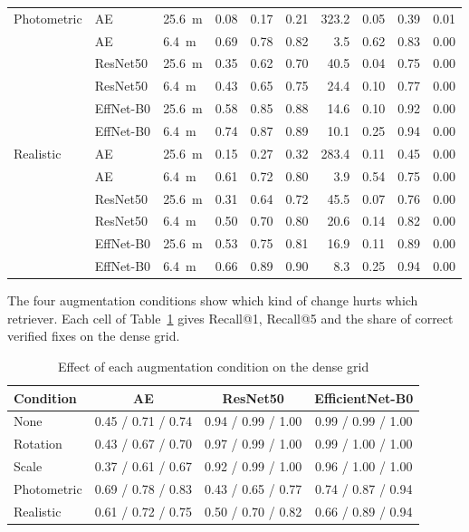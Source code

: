 \documentclass[english, Lau, oneside]{sapthesis}%
\begin{document}
\begin{table}[!htbp]
\begin{tabular}{lllrrrrrrr}
    \addlinespace
    Photometric & AE & 25.6~m & 0.08 & 0.17 & 0.21 & 323.2 & 0.05 & 0.39 & 0.01 \\
     & AE & 6.4~m & 0.69 & 0.78 & 0.82 & 3.5 & 0.62 & 0.83 & 0.00 \\
     & ResNet50 & 25.6~m & 0.35 & 0.62 & 0.70 & 40.5 & 0.04 & 0.75 & 0.00 \\
     & ResNet50 & 6.4~m & 0.43 & 0.65 & 0.75 & 24.4 & 0.10 & 0.77 & 0.00 \\
     & EffNet-B0 & 25.6~m & 0.58 & 0.85 & 0.88 & 14.6 & 0.10 & 0.92 & 0.00 \\
     & EffNet-B0 & 6.4~m & 0.74 & 0.87 & 0.89 & 10.1 & 0.25 & 0.94 & 0.00 \\
    \addlinespace
    Realistic & AE & 25.6~m & 0.15 & 0.27 & 0.32 & 283.4 & 0.11 & 0.45 & 0.00 \\
     & AE & 6.4~m & 0.61 & 0.72 & 0.80 & 3.9 & 0.54 & 0.75 & 0.00 \\
     & ResNet50 & 25.6~m & 0.31 & 0.64 & 0.72 & 45.5 & 0.07 & 0.76 & 0.00 \\
     & ResNet50 & 6.4~m & 0.50 & 0.70 & 0.80 & 20.6 & 0.14 & 0.82 & 0.00 \\
     & EffNet-B0 & 25.6~m & 0.53 & 0.75 & 0.81 & 16.9 & 0.11 & 0.89 & 0.00 \\
     & EffNet-B0 & 6.4~m & 0.66 & 0.89 & 0.90 & 8.3 & 0.25 & 0.94 & 0.00 \\
    \bottomrule
  \end{tabular}
\end{table}

The four augmentation conditions show which kind of change hurts which retriever. Each cell of Table~\ref{tab:retrieval-conditions} gives Recall@1, Recall@5 and the share of correct verified fixes on the dense grid.

\begin{table}[!htbp]
  \centering
  \caption{Effect of each augmentation condition on the dense grid}
  \label{tab:retrieval-conditions}
  \small
  \begin{tabular}{lccc}
    \toprule
    Condition & AE & ResNet50 & EfficientNet-B0 \\
    \midrule
    None & 0.45 / 0.71 / 0.74 & 0.94 / 0.99 / 1.00 & 0.99 / 0.99 / 1.00 \\
    Rotation & 0.43 / 0.67 / 0.70 & 0.97 / 0.99 / 1.00 & 0.99 / 1.00 / 1.00 \\
    Scale & 0.37 / 0.61 / 0.67 & 0.92 / 0.99 / 1.00 & 0.96 / 1.00 / 1.00 \\
    Photometric & 0.69 / 0.78 / 0.83 & 0.43 / 0.65 / 0.77 & 0.74 / 0.87 / 0.94 \\
    Realistic & 0.61 / 0.72 / 0.75 & 0.50 / 0.70 / 0.82 & 0.66 / 0.89 / 0.94 \\
    \bottomrule
  \end{tabular}
\end{table}
\end{document}
